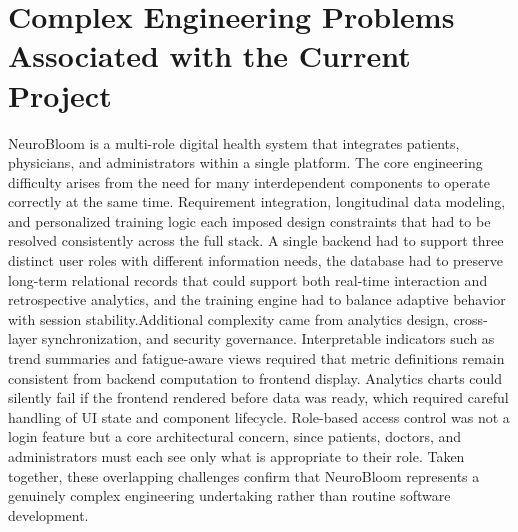 \documentclass[12pt,a4paper]{report}
\begin{document}
\section{Complex Engineering Problems Associated with the Current Project}
NeuroBloom is a multi-role digital health system that integrates patients, physicians, and administrators within a single platform. The core engineering difficulty arises from the need for many interdependent components to operate correctly at the same time. Requirement integration, longitudinal data modeling, and personalized training logic each imposed design constraints that had to be resolved consistently across the full stack. A single backend had to support three distinct user roles with different information needs, the database had to preserve long-term relational records that could support both real-time interaction and retrospective analytics, and the training engine had to balance adaptive behavior with session stability.Additional complexity came from analytics design, cross-layer synchronization, and security governance. Interpretable indicators such as trend summaries and fatigue-aware views required that metric definitions remain consistent from backend computation to frontend display. Analytics charts could silently fail if the frontend rendered before data was ready, which required careful handling of UI state and component lifecycle. Role-based access control was not a login feature but a core architectural concern, since patients, doctors, and administrators must each see only what is appropriate to their role. Taken together, these overlapping challenges confirm that NeuroBloom represents a genuinely complex engineering undertaking rather than routine software development.
\end{document}

